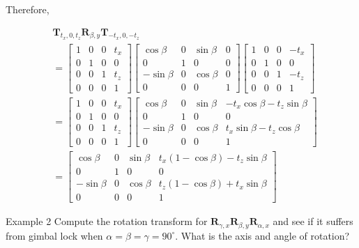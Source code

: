 Therefore,

$$
\begin{aligned}
& \mathbf{T}_{t_{x}, 0, t_{z}} \mathbf{R}_{\beta, y} \mathbf{T}_{-t_{x}, 0,-t_{z}} \\
&= {\left[\begin{array}{cccc}
1 & 0 & 0 & t_{x} \\
0 & 1 & 0 & 0 \\
0 & 0 & 1 & t_{z} \\
0 & 0 & 0 & 1
\end{array}\right]\left[\begin{array}{cccc}
\cos \beta & 0 & \sin \beta & 0 \\
0 & 1 & 0 & 0 \\
-\sin \beta & 0 & \cos \beta & 0 \\
0 & 0 & 0 & 1
\end{array}\right]\left[\begin{array}{cccc}
1 & 0 & 0 & -t_{x} \\
0 & 1 & 0 & 0 \\
0 & 0 & 1 & -t_{z} \\
0 & 0 & 0 & 1
\end{array}\right] } \\
&= {\left[\begin{array}{cccc}
1 & 0 & 0 & t_{x} \\
0 & 1 & 0 & 0 \\
0 & 0 & 1 & t_{z} \\
0 & 0 & 0 & 1
\end{array}\right]\left[\begin{array}{cccc}
\cos \beta & 0 & \sin \beta & -t_{x} \cos \beta-t_{z} \sin \beta \\
0 & 1 & 0 & 0 \\
-\sin \beta & 0 & \cos \beta & t_{x} \sin \beta-t_{z} \cos \beta \\
0 & 0 & 0 & 1
\end{array}\right] } \\
&= {\left[\begin{array}{ccccc}
\cos \beta & 0 & \sin \beta & t_{x}(1-\cos \beta)-t_{z} \sin \beta \\
0 & 1 & 0 & 0 \\
-\sin \beta & 0 & \cos \beta & t_{z}(1-\cos \beta)+t_{x} \sin \beta \\
0 & 0 & 0 & 1
\end{array}\right] }
\end{aligned}
$$

Example 2 Compute the rotation transform for $\mathbf{R}_{\gamma, x} \mathbf{R}_{\beta, y} \mathbf{R}_{\alpha, x}$ and see if it suffers from gimbal lock when $\alpha=\beta=\gamma=90^{\circ}$. What is the axis and angle of rotation?

